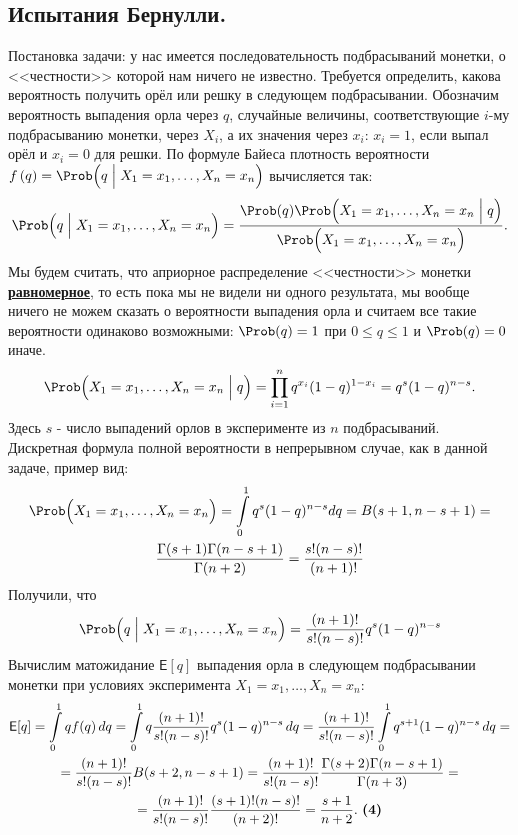 \documentclass[12pt]{article}
\begin{document}
\subsection{Испытания Бернулли.}
Постановка задачи: у нас имеется последовательность подбрасываний монетки, о <<честности>> которой нам ничего не известно. Требуется определить, какова вероятность получить орёл или решку в следующем подбрасывании.
\newline
\newline
Обозначим вероятность выпадения орла через $q$, случайные величины, соответствующие $i$-му подбрасыванию монетки, через $X_i$, а их значения через $x_i$: $x_i = 1$, если выпал орёл и $x_i = 0$ для решки. По формуле Байеса плотность вероятности $f\left(q\right) = \Prob \Bigl (q\; \Bigl|\; X_1 = x_1, \dots, X_n = x_n \Bigr )$ вычисляется так:
\begin{align}
\Prob \Bigl (q\; \Bigl|\; X_1 = x_1, \dots, X_n = x_n \Bigr ) = \frac{\Prob(q)\Prob \Bigl (X_1 = x_1, \dots, X_n = x_n \; \Bigl|\; q \Bigr )}{\Prob \Bigl (X_1 = x_1, \dots, X_n = x_n \Bigr )}. 
 \end{align}
Мы будем считать, что априорное распределение <<честности>> монетки \underline{\textbf{равномерное}}, то есть пока мы не видели ни одного результата, мы вообще ничего не можем сказать о вероятности выпадения орла и считаем все такие вероятности одинаково возможными: $\Prob(q) = 1$ при $0 \leq q \leq 1$ и $\Prob(q) = 0$ иначе. 
\begin{align}
\Prob \Bigl (X_1 = x_1, \dots, X_n = x_n \; \Bigl|\; q \Bigr ) = \prod\limits_{i = 1}^{n} q^{x_i}(1 - q)^{1 - x_i} = q^s(1 - q)^{n - s}.
\end{align} Здесь $s$ - число выпадений орлов в эксперименте из $n$ подбрасываний.
\newline
\newline
Дискретная формула полной вероятности в непрерывном случае, как в данной задаче, пример вид:
\begin{multline*}
\Prob \Bigl (X_1 = x_1, \dots, X_n = x_n\Bigr ) = \int \limits_0^1 q^s(1 - q)^{n - s} dq = 
B(s + 1, n - s + 1) = \\ \frac{\Gamma(s + 1) \Gamma(n - s + 1)}{\Gamma(n + 2)} = \frac{s! (n - s)!}{(n + 1)!}
\end{multline*}
Получили, что 
\begin{align}
\Prob \Bigl (q\; \Bigl|\; X_1 = x_1, \dots, X_n = x_n \Bigr ) = \frac{(n + 1)!}{s! (n - s)!}q^s(1 - q)^{n - s}
\end{align}
Вычислим матожидание $\mathsf E[q]$ выпадения орла в следующем подбрасывании монетки при условиях эксперимента $X_1 = x_1, \dots, X_n = x_n$:
\begin{multline*}
\mathsf E [q] = \int \limits_0^1 qf(q)\, dq = \int \limits_0^1 q \frac{(n + 1)!}{s! (n - s)!}q^s(1 - q)^{n - s}\, dq = \frac{(n + 1)!}{s! (n - s)!}  \int \limits_0^1 q^{s + 1}(1 - q)^{n - s}\, dq = \\ = \frac{(n + 1)!}{s! (n - s)!} B(s + 2, n - s + 1) =  \frac{(n + 1)!}{s! (n - s)!} \frac{\Gamma(s + 2) \Gamma(n - s + 1)}{\Gamma(n + 3)} = \\ = \frac{(n + 1)!}{s! (n - s)!} \frac{(s+ 1)! (n - s)!}{(n + 2)!} = \frac{s + 1}{n + 2}.$ $\textbf{(4)}
\end{multline*}
\newpage
\end{document}
